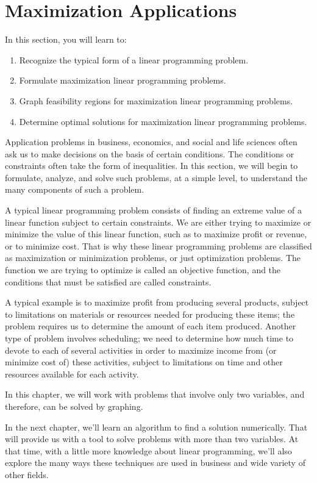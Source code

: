 \section{Maximization Applications}

In this section, you will learn to:
\begin{enumerate}
    \item Recognize the typical form of a linear programming problem.
    \item Formulate maximization linear programming problems.
    \item Graph feasibility regions for maximization linear programming problems.
    \item Determine optimal solutions for maximization linear programming problems.
\end{enumerate}

Application problems in business, economics, and social and life sciences often ask us to make decisions on the basis of certain conditions.  The conditions or constraints  often take the form of inequalities.  In this section, we will begin to formulate, analyze, and solve such problems, at a simple level, to understand the many components of such a problem.

A typical linear programming problem consists of finding an extreme value of a linear function subject to certain constraints.  We are either trying to maximize or minimize the value of this linear function, such as to maximize profit or revenue, or to minimize cost.  That is why these linear programming problems are classified as maximization or minimization problems, or just optimization problems.  The function we are trying to optimize is called an objective function, and the conditions that must be satisfied are called constraints.

A typical example is to maximize profit from producing several products, subject to limitations on materials or resources needed for producing these items; the problem requires us to determine the amount of each item produced.  Another type of problem involves scheduling; we need to determine how much time to devote to each of several activities in order to maximize income from (or minimize cost of) these activities, subject to limitations on time and other resources available for each activity.

In this chapter, we will work with problems that involve only two variables, and therefore, can be solved by graphing.

In the next chapter, we'll learn an algorithm to find a solution numerically.  That will provide us with a tool to solve problems with more than two variables. At that time, with a little more knowledge about linear programming, we’ll also explore the many ways these techniques are used in business and wide variety of other fields.

